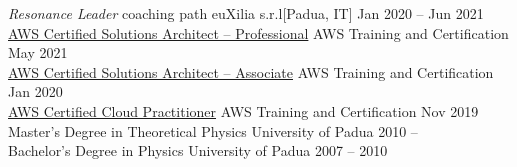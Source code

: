 \documentclass[9pt]{scrartcl}
\def\Phi{1.618}
\newlength{\Pad}\setlength{\Pad}{14.562pt} %
\begin{document}
\Event
  {\emph{Resonance Leader} coaching path}
  {euXilia s.r.l}[Padua, IT]
  {Jan 2020 -- Jun 2021}\\
\Event
  {\href{https://www.credly.com/badges/37aaaf27-3a2e-436d-9195-db4f46eb222e/public_url}
  {%
   AWS Certified Solutions Architect -- Professional}}
  {AWS Training and Certification}
  {May 2021}\\
\Event
  {\href{https://www.credly.com/badges/d092afab-f194-4074-ade6-78728c854faa/public_url}
  {%
   AWS Certified Solutions Architect -- Associate}}
  {AWS Training and Certification}
  {Jan 2020}\\
\Event
  {\href{https://www.credly.com/badges/d268e963-65ba-462b-a835-f65a7baccccd/public_url}
  {%
   AWS Certified Cloud Practitioner}}
  {AWS Training and Certification}
  {Nov 2019}\\
\Event
  {Master's Degree in Theoretical Physics}
  {University of Padua}
  {2010 -- }\\
\Event
  {Bachelor's Degree in Physics}
  {University of Padua}
  {2007 -- 2010}\\
\end{document}
